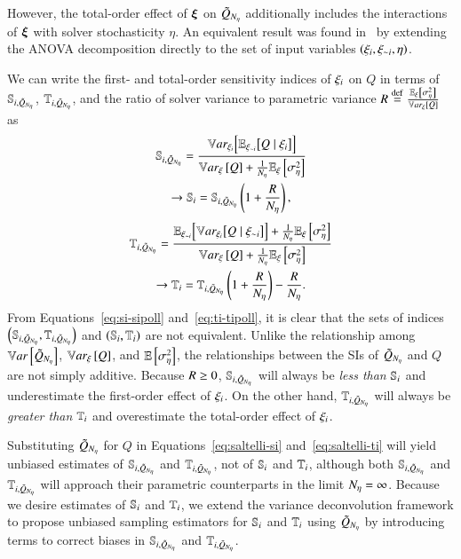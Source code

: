 However, the total-order effect of $\bxi$ on $\Qpoll$ additionally includes the interactions of $\bxi$ with solver stochasticity $\eta$. 
An equivalent result was found in~\cite{marrel-etal-2012} by extending the ANOVA decomposition directly to the set of input variables $\left( \xii, \xini, \eta \right)$.

We can write the first- and total-order sensitivity indices of $\xii$ on $Q$ in terms of $\Spoll{i}$, $\Tpoll{i}$, and the ratio of solver variance to parametric variance $\tempsymbol \defin \frac{\EExi{\Sigsqeta}}{\Vxi{Q}}$ as
\begin{gather} \nonumber
    \Spoll{i} = \frac{\VEi{Q \mid \xii}}{\Vxi{Q} + \frac{1}{\Neta}\EExi{\Sigsqeta}} \\ \label{eq:si-sipoll}
    \rightarrow \S{i} = \Spoll{i} \left( 1 + \frac{\tempsymbol}{\Neta} \right) ,
\end{gather}
\begin{gather} \nonumber
    \Tpoll{i} = \frac{\EVni{Q \mid \xini} + \frac{1}{\Neta}\EExi{\Sigsqeta}}{\Vxi{Q} + \frac{1}{\Neta}\EExi{\Sigsqeta}} \\ \label{eq:ti-tipoll}
    \rightarrow \T{i} = \Tpoll{i}\left( 1 + \frac{\tempsymbol}{\Neta} \right) - \frac{\tempsymbol}{\Neta} .
\end{gather}
%
From Equations~\eqref{eq:si-sipoll} and~\eqref{eq:ti-tipoll}, it is clear that the sets of indices $\left(\Spoll{i}, \Tpoll{i} \right)$ and $\left(\S{i}, \T{i}\right)$ are not equivalent. 
Unlike the relationship among $\Var{\Qpoll}$, $\Vxi{Q}$, and $\EE{\Sigsqeta}$, the relationships between the SIs of $\Qpoll$ and $Q$ are not simply additive.
Because $\tempsymbol \geq 0$, $\Spoll{i}$ will always be \emph{less than} $\S{i}$ and underestimate the first-order effect of $\xii$.
On the other hand, $\Tpoll{i}$ will always be \emph{greater than} $\T{i}$ and overestimate the total-order effect of $\xii$. 

Substituting $\Qpoll$ for $Q$ in Equations~\eqref{eq:saltelli-si} and~\eqref{eq:saltelli-ti} will yield unbiased estimates of $\Spoll{i}$ and $\Tpoll{i}$, not of $\S{i}$ and $\T{i}$, although both $\Spoll{i}$ and $\Tpoll{i}$ will approach their parametric counterparts in the limit $\Neta=\infty$.
Because we desire estimates of $\S{i}$ and $\T{i}$, we extend the variance deconvolution framework to propose unbiased sampling estimators for $\S{i}$ and $\T{i}$ using $\Qpoll$ by introducing terms to correct biases in $\Spoll{i}$ and $\Tpoll{i}$. 


